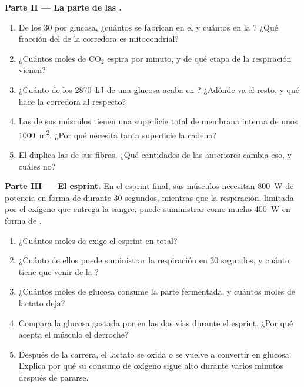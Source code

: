 \begin{problem}
\medskip
\noindent\textbf{Parte II --- La parte de las .}
\begin{enumerate}[resume]
  \item De los 30  por glucosa, ¿cuántos se fabrican en el
         y cuántos en la ? ¿Qué fracción del 
        de la corredora es mitocondrial?
  \item ¿Cuántos moles de $\mathrm{CO_2}$ espira por minuto, y de qué
        etapa de la respiración vienen?
  \item ¿Cuánto de los \qty{2870}{kJ} de una glucosa acaba en ?
        ¿Adónde va el resto, y qué hace la corredora al respecto?
  \item Las  de sus músculos tienen una superficie total de
        membrana interna de unos \qty{1000}{m^2}. ¿Por qué necesita
        tanta superficie la cadena?
  \item El  duplica las  de sus fibras. ¿Qué
        cantidades de las anteriores cambia eso, y cuáles no?
\end{enumerate}

\medskip
\noindent\textbf{Parte III --- El esprint.}
En el esprint final, sus músculos necesitan \qty{800}{W} de potencia en
forma de  durante 30 segundos, mientras que la respiración, limitada
por el oxígeno que entrega la sangre, puede suministrar como mucho
\qty{400}{W} en forma de .
\begin{enumerate}[resume]
  \item ¿Cuántos moles de  exige el esprint en total?
  \item ¿Cuánto de ellos puede suministrar la respiración en 30
        segundos, y cuánto tiene que venir de la ?
  \item ¿Cuántos moles de glucosa consume la parte fermentada, y
        cuántos moles de lactato deja?
  \item Compara la glucosa gastada por  en las dos vías durante el
        esprint. ¿Por qué acepta el músculo el derroche?
  \item Después de la carrera, el lactato se oxida o se vuelve a
        convertir en glucosa. Explica por qué su consumo de oxígeno
        sigue alto durante varios minutos después de pararse.
\end{enumerate}


\end{problem}
